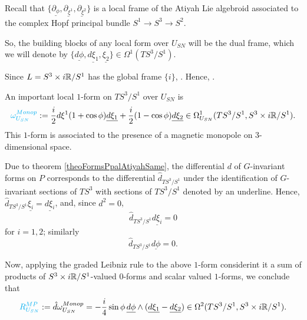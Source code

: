 \begin{example}[Hopf $S^3$]
Recall that $\{\underline{\partial_\phi}, \underline{\partial_{\xi^1}}, \underline{\partial_{\xi^2}}\}$ is a local frame of the Atiyah Lie algebroid associated to the complex Hopf principal bundle $S^1 \to S^3 \to S^2$. 

So, the building blocks of any local form over $U_{SN}$ will be the dual frame, which we will denote by $\{\underline{d\phi}, \underline{d\xi_1}, \underline{\xi_2}\} \in \Omega^1(TS^3/S^1)$. 

Since $L = S^3 \times i\mathbb{R} / S^1$ has the global frame $\{i\}$, . Hence, .

An important local $1$-form on $TS^3/S^1$ over $U_{SN}$ is
\begin{equation}
    \lbtext{\omega^{Monop}_{U_{SN}}} := \frac{i}{2} d\xi^1 (1 + \cos \phi) \underline{d \xi_1} + \frac{i}{2} (1- \cos\phi)\underline{d\xi_2} \in \Omega_{U_{SN}}^1(TS^3/S^1, S^3 \times i\RR/S^1).
\end{equation} This $1$-form is associated to the presence of a magnetic monopole on $3$-dimensional space.

Due to theorem \ref{theoFormsPpalAtiyahSame}, the differential $d$ of $G$-invariant forms on $P$ corresponds to the differential $\hat d_{TS^3/S^1}$ under the identification of $G$-invariant sections of $TS^3$ with sections of $TS^3/S^1$ denoted by an underline. Hence, $\hat d_{TS^3/S^1} \underline{\xi_i} = \underline{d \xi_i}$, and, since $d^2 = 0$, 
\begin{equation*}
    \hat d_{TS^3/S^1} {\underline{d\xi_i}} = 0
\end{equation*} for $i = 1, 2$; similarly 
\begin{equation*}
     \hat d_{TS^3/S^1} \underline{d \phi} = 0.
\end{equation*}

Now, applying the graded Leibniz rule to the above $1$-form considerint it a sum of products of $S^3\times i\mathbb{R}/S^1$-valued $0$-forms and scalar valued $1$-forms, we conclude that
\begin{equation}
    \lbtext{R^{MP}_{U_{SN}}} 
    := \hat d \omega^{Monop}_{U_{SN}} = -\frac{i}{4} \sin \phi \, \underline{d\phi} \wedge (\underline{d\xi_1} - \underline{d\xi_2}) 
    \in \Omega^2(TS^3/S^1, S^3 \times i\RR / S^1).
\end{equation}
\end{example}


